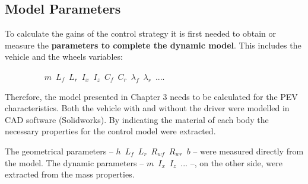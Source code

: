 \newpage
\subsection{Model Parameters}

To calculate the gains of the control strategy it is first needed to obtain or measure the \textbf{parameters to complete the dynamic model}. This includes the vehicle and the wheels variables: 

$\hspace{2cm} m \enspace L_{f} \enspace L_{r} \enspace I_{x} \enspace I_{z} \enspace C_{f} \enspace C_{r} \enspace \lambda_{f} \enspace \lambda_{r} \enspace ...$.

Therefore, the model presented in Chapter 3 needs to be calculated for the PEV characteristics. Both the vehicle with and without the driver were modelled in CAD software (Solidworks). By indicating the material of each body the necessary properties for the control model were extracted.

The geometrical parameters -- $h \enspace L_{f} \enspace L_{r} \enspace R_{wf}\enspace R_{wr}\enspace b$ -- were measured directly from the model. The dynamic parameters -- $m \enspace I_{x} \enspace I_{z} \enspace ...$ --, on the other side, were extracted from the mass properties.

